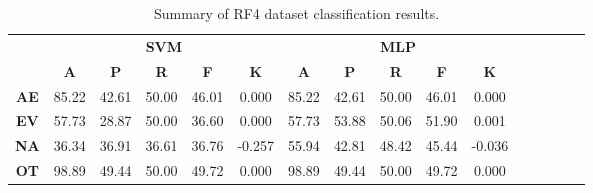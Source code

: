 \begin{landscape}
\begin{table}[htbp]
\footnotesize
\centering
\caption{Summary of RF4 dataset classification results.}
\label{tab:base_female}
\begin{tabular}{|c|c|c|c|c|c|c|c|c|c|c|c|c|c|c|c|}
\hline
\multirow{2}{*}{}	& \multicolumn{5}{c|}{\textbf{SVM}}												& \multicolumn{5}{c|}{\textbf{MLP}}												\\ \cline{2-11} 
					& \textbf{A}	& \textbf{P}	& \textbf{R}	& \textbf{F}	& \textbf{K}	& \textbf{A}	& \textbf{P}	& \textbf{R}	& \textbf{F}	& \textbf{K}	\\ \hline
\textbf{AE}			& 85.22			& 42.61			& 50.00			& 46.01			& 0.000			& 85.22			& 42.61			& 50.00			& 46.01			& 0.000			\\ \hline
\textbf{EV}			& 57.73			& 28.87			& 50.00			& 36.60			& 0.000			& 57.73			& 53.88			& 50.06			& 51.90			& 0.001			\\ \hline
\textbf{NA}			& 36.34			& 36.91			& 36.61			& 36.76			& -0.257			& 55.94			& 42.81			& 48.42			& 45.44			& -0.036			\\ \hline
\textbf{OT}			& 98.89			& 49.44			& 50.00			& 49.72			& 0.000			& 98.89			& 49.44			& 50.00			& 49.72			& 0.000			\\ \hline
\end{tabular}
\end{table}
\end{landscape}